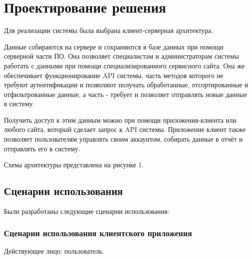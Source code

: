 
\section{Проектирование решения}

\tab
Для реализации системы была выбрана клиент-серверная архитектура.

\tab
Данные собираются на сервере и сохраняются в базе данных при помощи серверной части ПО.
Она позволяет специалистам и администраторам системы работать с данными при помощи специализированного сервисного сайта.
Она же обеспечивает функционирование API системы, часть методов которого не требуют аутентификации и позволяют получать обработанные, отсортированные и отфильтрованные данные, а часть - требует и позволяет отправлять новые данные в систему.

\tab
Получить доступ к этим данным можно при помощи приложения-клиента или любого сайта, который сделает запрос к API системы.
Приложение клиент также позволяет пользователям управлять своим аккаунтом, собирать данные в отчёт и отправлять его в систему.

\tab
Схема архитектуры представлена на рисунке 1.
\pictureone

\subsection{Сценарии использования}

\tab
Были разработаны следующие сценарии использования:

\subsubsection{Сценарии использования клиентского приложения}

\tab
Действующее лицо: пользователь.

